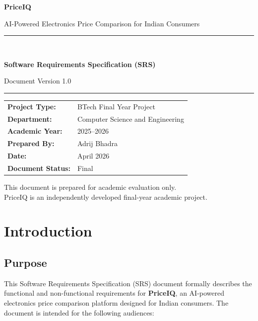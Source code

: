 \documentclass[12pt,a4paper]{report}
\begin{document}
\begin{titlepage}
  \centering
  \vspace*{1.8cm}
  {\Huge\bfseries\color{priblue} PriceIQ\par}
  \vspace{0.4cm}
  {\large AI-Powered Electronics Price Comparison for Indian Consumers\par}
  \vspace{1.4cm}
  \rule{0.85\linewidth}{1.5pt}\\[0.5cm]
  {\LARGE\bfseries Software Requirements Specification (SRS)\par}
  \vspace{0.3cm}
  {\large Document Version 1.0\par}
  \rule{0.85\linewidth}{1.5pt}
  \vspace{1.8cm}

  \begin{tabular}{@{}ll@{}}
    \textbf{Project Type:}   & BTech Final Year Project \\[4pt]
    \textbf{Department:}     & Computer Science and Engineering \\[4pt]
    \textbf{Academic Year:}  & 2025--2026 \\[4pt]
    \textbf{Prepared By:}    & Adrij Bhadra \\[4pt]
    \textbf{Date:}           & April 2026 \\[4pt]
    \textbf{Document Status:}& Final \\
  \end{tabular}

  \vfill
  {\small This document is prepared for academic evaluation only.\\
  PriceIQ is an independently developed final-year academic project.}
\end{titlepage}

\tableofcontents
\newpage

\chapter{Introduction}

\section{Purpose}
This Software Requirements Specification (SRS) document formally describes the
functional and non-functional requirements for \textbf{PriceIQ}, an AI-powered
electronics price comparison platform designed for Indian consumers. The document
is intended for the following audiences:
\end{document}
